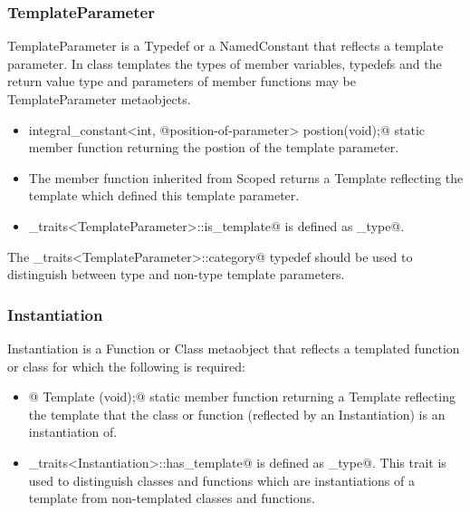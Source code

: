 \subsubsection{TemplateParameter}

{\metaobject TemplateParameter} is a {\metaobject Typedef} or a {\metaobject NamedConstant} that
reflects a template parameter. In class templates the types of member variables, typedefs and
the return value type and parameters of member functions may be {\metaobject TemplateParameter}
metaobjects.

\begin{itemize}
	\item{\verb@static integral_constant<int, @{\metaobject position-of-parameter}\verb@> postion(void);@}
	static member function returning the postion of the template parameter.

	\item The \verb@scope@ member function inherited from {\metaobject Scoped} returns a {\metaobject Template}
	reflecting the template which defined this template parameter.

	\item \verb@metaobject_traits<TemplateParameter>::is_template@ is defined as \verb@true_type@.
\end{itemize}

The \verb@metaobject_traits<TemplateParameter>::category@ typedef should be used to distinguish between
type and non-type template parameters.

\subsubsection{Instantiation}

{\metaobject Instantiation} is a {\metaobject Function} or {\metaobject Class} metaobject
that reflects a templated function or class for which the following is required:

\begin{itemize}

	\item{\verb@static @ {\metaobject Template} \verb@model(void);@} static member function returning
	a {\metaobject Template} reflecting the template that the class or function 
	(reflected by an {\metaobject Instantiation}) is an instantiation of.

	\item \verb@metaobject_traits<Instantiation>::has_template@ is defined as \verb@true_type@.
	This trait is used to distinguish classes and functions which are instantiations
	of a template from non-templated classes and functions.
\end{itemize}

